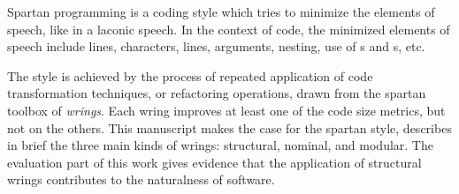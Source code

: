 
Spartan programming is a coding  style which tries to minimize the elements of
speech, like in a laconic speech.
In the context of code, the minimized elements of speech include 
lines, characters, lines, arguments, nesting, use of s and
s, etc.  

The style is achieved by the process of repeated application of code
transformation techniques, or refactoring operations, drawn from the spartan
toolbox of \emph{wrings}.  Each wring improves at least one of the code size
metrics, but not on the others.  This manuscript makes the case for the spartan
style, describes in brief 
the three main kinds of wrings: structural, nominal, and modular. 
The evaluation part of this work gives evidence that the application of
structural wrings contributes to the naturalness of software. 


